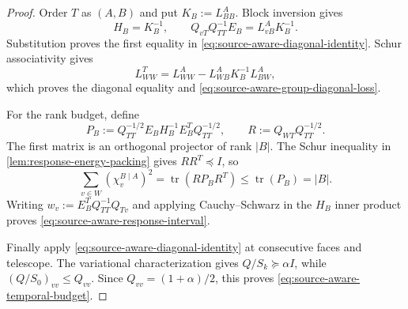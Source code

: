 \begin{proof}
Order $T$ as $(A,B)$ and put $K_B:=L^A_{BB}$.  Block inversion gives
\begin{equation*}
 H_B=K_B^{-1},
 \qquad
 Q_{vT}Q_{TT}^{-1}E_B=L^A_{vB}K_B^{-1}.
\end{equation*}
Substitution proves the first equality in
\cref{eq:source-aware-diagonal-identity}.  Schur associativity gives
\begin{equation*}
 L^T_{WW}
 =L^A_{WW}-L^A_{WB}K_B^{-1}L^A_{BW},
\end{equation*}
which proves the diagonal equality and
\cref{eq:source-aware-group-diagonal-loss}.

For the rank budget, define
\begin{equation*}
 P_B:=Q_{TT}^{-1/2}E_BH_B^{-1}E_B^TQ_{TT}^{-1/2},
 \qquad
 R:=Q_{WT}Q_{TT}^{-1/2}.
\end{equation*}
The first matrix is an orthogonal projector of rank $|B|$.  The Schur
inequality in \cref{lem:response-energy-packing} gives $RR^T\preceq I$, so
\begin{equation*}
 \sum_{v\in W}(\chi_v^{B\mid A})^2
 =\operatorname{tr}(RP_BR^T)
 \leq\operatorname{tr}(P_B)=|B|.
\end{equation*}
Writing $w_v:=E_B^TQ_{TT}^{-1}Q_{Tv}$ and applying Cauchy--Schwarz in the
$H_B$ inner product proves
\cref{eq:source-aware-response-interval}.

Finally apply \cref{eq:source-aware-diagonal-identity} at consecutive faces
and telescope.  The variational characterization gives
$Q/S_k\succeq\alpha I$, while $(Q/S_0)_{vv}\leq Q_{vv}$.  Since
$Q_{vv}=(1+\alpha)/2$, this proves
\cref{eq:source-aware-temporal-budget}.
\end{proof}

